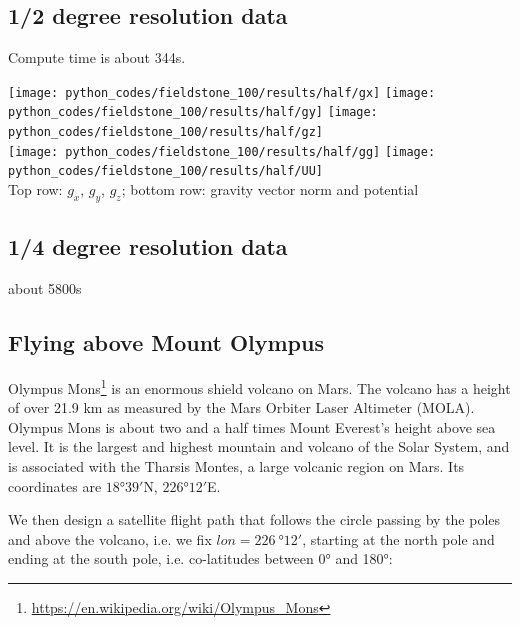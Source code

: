 \subsection*{1/2 degree resolution data}

Compute time is about 344s. 

\begin{center}
\texttt{[image: python\_codes/fieldstone\_100/results/half/gx]}
\texttt{[image: python\_codes/fieldstone\_100/results/half/gy]}
\texttt{[image: python\_codes/fieldstone\_100/results/half/gz]}\\
\texttt{[image: python\_codes/fieldstone\_100/results/half/gg]}
\texttt{[image: python\_codes/fieldstone\_100/results/half/UU]}\\
{\captionfont Top row: $g_x$, $g_y$, $g_z$;
bottom row: gravity vector norm and potential}
\end{center}

\subsection*{1/4 degree resolution data}

about 5800s



\newpage
\subsection*{Flying above Mount Olympus}

Olympus Mons\footnote{\url{https://en.wikipedia.org/wiki/Olympus_Mons}} 
is an enormous shield volcano on Mars. 
The volcano has a height of over 21.9 km as measured by the Mars Orbiter Laser Altimeter (MOLA).
Olympus Mons is about two and a half times Mount Everest's height above sea level. 
It is the largest and highest mountain and volcano of the Solar System,
and is associated with the Tharsis Montes, a large volcanic region on Mars.
Its coordinates are $18\si{\degree}39'$N, $226\si{\degree}12'$E. 

We then design a satellite flight path that follows the circle passing by the poles and above 
the volcano, i.e. we fix $lon=226~\si{\degree}12'$, starting at the north pole and ending 
at the south pole, i.e. co-latitudes between 0\si{\degree} and 180\si{\degree}:


